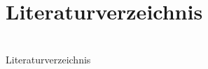 \documentclass[hyperref={pdfpagemode=FullScreen, colorlinks=false}]{beamer}
\begin{document}

\section{Literaturverzeichnis}

\section{} %
\begin{frame}[allowframebreaks]{Literaturverzeichnis}
	\printbibliography
\end{frame}
\end{document}
